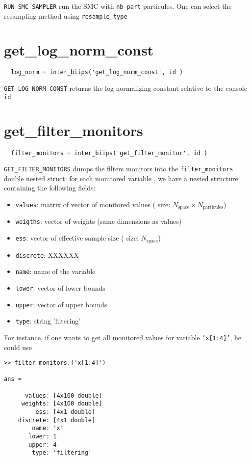 \documentclass[11pt]{article}
\begin{document}
  \texttt{RUN\_SMC\_SAMPLER} run the SMC with \texttt{nb\_part} particules. One can select the resampling method using \texttt{resample\_type}
  \section{get\_log\_norm\_const}

 \begin{lstlisting}
  log_norm = inter_biips('get_log_norm_const', id )
 \end{lstlisting}
 \texttt{GET\_LOG\_NORM\_CONST} returns the log normalizing constant relative to the console \texttt{id}

 \section{get\_filter\_monitors}

 \begin{lstlisting}
  filter_monitors = inter_biips('get_filter_monitor', id )
 \end{lstlisting}

 \texttt{GET\_FILTER\_MONITORS} dumps the filters monitors into the \texttt{filter\_monitors} double nested struct: for each monitored variable , we have
  a nested structure containing the following fields:
  \begin{itemize}
   \item \texttt{values}: matrix of vector of monitored values ( size: $N_{\mbox{space}} \times N_{\mbox{particules}}$)
   \item \texttt{weigths}: vector of weights (same dimensions as values)
   \item \texttt{ess}: vector of effective  sample size ( size: $N_{\mbox{space}}$)
   \item \texttt{discrete}: XXXXXX
   \item \texttt{name}: name of the variable
   \item \texttt{lower}: vector of lower bounds
   \item \texttt{upper}: vector of upper bounds
   \item \texttt{type}: string  'filtering'
   \end{itemize}

  For instance, if one wants to get all monitored values for variable \texttt{'x[1:4]'}, he could use
 \begin{lstlisting}
>> filter_monitors.('x[1:4]') 

ans = 

      values: [4x100 double]
     weights: [4x100 double]
         ess: [4x1 double]
    discrete: [4x1 double]
        name: 'x'
       lower: 1
       upper: 4
        type: 'filtering'
 
 \end{lstlisting}
\end{document}
